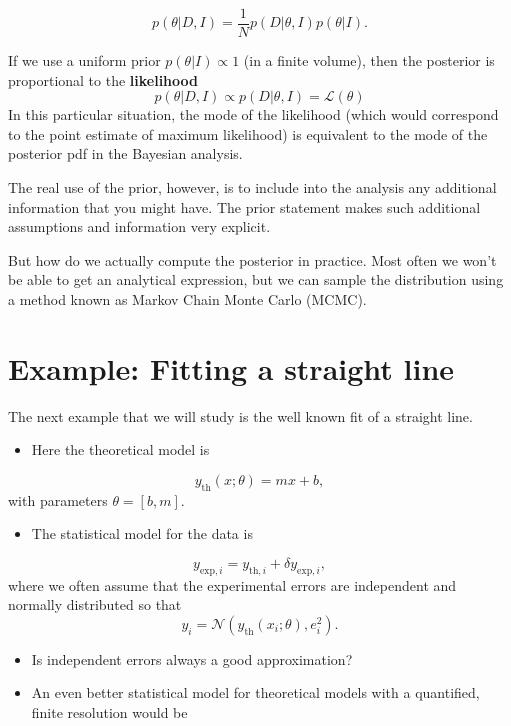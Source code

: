 \documentclass[%
oneside,                 %
final,                   %
10pt]{article}
\begin{document}
\noindent
\[
p(\theta | D,I) = \frac{1}{N} p(D|\theta,I) p(\theta|I).
\]

If we use a uniform prior $p(\theta | I ) \propto 1$ (in a finite volume), then the posterior is proportional to the \textbf{likelihood}
\[
p(\theta | D,I) \propto p(D|\theta,I) = \mathcal{L}(\theta)
\]
In this particular situation, the mode of the likelihood (which would correspond to the point estimate of maximum likelihood) is equivalent to the mode of the posterior pdf in the Bayesian analysis.

The real use of the prior, however, is to include into the analysis any additional information that you might have. The prior statement makes such additional assumptions and information very explicit.

But how do we actually compute the posterior in practice. Most often we won't be able to get an analytical expression, but we can sample the distribution using a method known as Markov Chain Monte Carlo (MCMC).

\section{Example: Fitting a straight line}
The next example that we will study is the well known fit of a straight line.

\begin{itemize}
\item Here the theoretical model is
\end{itemize}

\noindent
\[
y_\mathrm{th}(x; \theta) = m x + b,
\]
with parameters $\theta = [b,m]$.

\begin{itemize}
\item The statistical model for the data is
\end{itemize}

\noindent
\[
y_{\mathrm{exp},i} = y_{\mathrm{th},i} + \delta y_{\mathrm{exp},i},
\]
where we often assume that the experimental errors are independent and normally distributed so that
\[
y_i = \mathcal{N} \left( y_\mathrm{th}(x_i; \theta), e_i^2 \right).
\]

\begin{itemize}
\item Is independent errors always a good approximation?

\item An even better statistical model for theoretical models with a quantified, finite resolution would be
\end{itemize}
\end{document}
